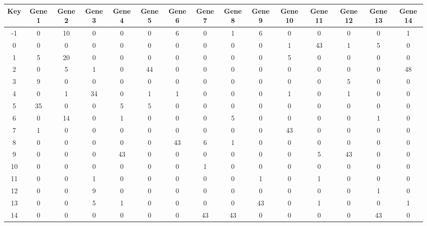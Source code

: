 \begin{tabular}{|c|c|c|c|c|c|c|c|c|c|c|c|c|c|c|}
\hline
Key & Gene 1 & Gene 2 & Gene 3 & Gene 4 & Gene 5 & Gene 6 & Gene 7 & Gene 8 & Gene 9 & Gene 10 & Gene 11 & Gene 12 & Gene 13 & Gene 14 \\
\hline
-1 & 0 & 10 & 0 & 0 & 0 & 6 & 0 & 1 & 6 & 0 & 0 & 0 & 0 & 1 \\
0 & 0 & 0 & 0 & 0 & 0 & 0 & 0 & 0 & 0 & 1 & 43 & 1 & 5 & 0 \\
1 & 5 & 20 & 0 & 0 & 0 & 0 & 0 & 0 & 0 & 5 & 0 & 0 & 0 & 0 \\
2 & 0 & 5 & 1 & 0 & 44 & 0 & 0 & 0 & 0 & 0 & 0 & 0 & 0 & 48 \\
3 & 9 & 0 & 0 & 0 & 0 & 0 & 0 & 0 & 0 & 0 & 0 & 5 & 0 & 0 \\
4 & 0 & 1 & 34 & 0 & 1 & 1 & 0 & 0 & 0 & 1 & 0 & 1 & 0 & 0 \\
5 & 35 & 0 & 0 & 5 & 5 & 0 & 0 & 0 & 0 & 0 & 0 & 0 & 0 & 0 \\
6 & 0 & 14 & 0 & 1 & 0 & 0 & 0 & 5 & 0 & 0 & 0 & 0 & 1 & 0 \\
7 & 1 & 0 & 0 & 0 & 0 & 0 & 0 & 0 & 0 & 43 & 0 & 0 & 0 & 0 \\
8 & 0 & 0 & 0 & 0 & 0 & 43 & 6 & 1 & 0 & 0 & 0 & 0 & 0 & 0 \\
9 & 0 & 0 & 0 & 43 & 0 & 0 & 0 & 0 & 0 & 0 & 5 & 43 & 0 & 0 \\
10 & 0 & 0 & 0 & 0 & 0 & 0 & 1 & 0 & 0 & 0 & 0 & 0 & 0 & 0 \\
11 & 0 & 0 & 1 & 0 & 0 & 0 & 0 & 0 & 1 & 0 & 1 & 0 & 0 & 0 \\
12 & 0 & 0 & 9 & 0 & 0 & 0 & 0 & 0 & 0 & 0 & 0 & 0 & 1 & 0 \\
13 & 0 & 0 & 5 & 1 & 0 & 0 & 0 & 0 & 43 & 0 & 1 & 0 & 0 & 1 \\
14 & 0 & 0 & 0 & 0 & 0 & 0 & 43 & 43 & 0 & 0 & 0 & 0 & 43 & 0 \\
\hline
\end{tabular}